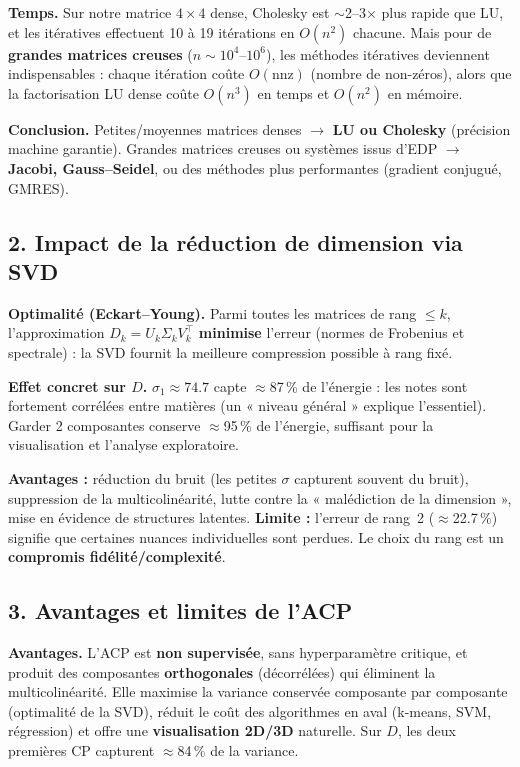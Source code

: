 \documentclass[11pt,a4paper]{article}
\begin{document}
\noindent\textbf{Temps.} Sur notre matrice $4\times4$ dense, Cholesky est $\sim$2--3$\times$ plus
rapide que LU, et les itératives effectuent 10 à 19 itérations en $O(n^2)$ chacune. Mais pour de
\textbf{grandes matrices creuses} ($n\sim10^4$--$10^6$), les méthodes itératives deviennent
indispensables : chaque itération coûte $O(\text{nnz})$ (nombre de non-zéros), alors que la
factorisation LU dense coûte $O(n^3)$ en temps et $O(n^2)$ en mémoire.

\noindent\textbf{Conclusion.} Petites/moyennes matrices denses $\rightarrow$ \textbf{LU ou
Cholesky} (précision machine garantie). Grandes matrices creuses ou systèmes issus d'EDP
$\rightarrow$ \textbf{Jacobi, Gauss--Seidel}, ou des méthodes plus performantes (gradient
conjugué, GMRES).

\subsection*{2. Impact de la réduction de dimension via SVD}
\textbf{Optimalité (Eckart--Young).} Parmi toutes les matrices de rang $\le k$, l'approximation
$D_k=U_k\Sigma_k V_k^{\top}$ \textbf{minimise} l'erreur (normes de Frobenius et spectrale) : la SVD
fournit la meilleure compression possible à rang fixé.

\noindent\textbf{Effet concret sur $D$.} $\sigma_1\approx74.7$ capte $\approx$87\,\% de l'énergie :
les notes sont fortement corrélées entre matières (un « niveau général » explique l'essentiel).
Garder 2 composantes conserve $\approx$95\,\% de l'énergie, suffisant pour la visualisation et
l'analyse exploratoire.

\noindent\textbf{Avantages :} réduction du bruit (les petites $\sigma$ capturent souvent du bruit),
suppression de la multicolinéarité, lutte contre la « malédiction de la dimension », mise en
évidence de structures latentes. \textbf{Limite :} l'erreur de rang~2 ($\approx$22.7\,\%)
signifie que certaines nuances individuelles sont perdues. Le choix du rang est un
\textbf{compromis fidélité/complexité}.

\subsection*{3. Avantages et limites de l'ACP}
\textbf{Avantages.} L'ACP est \textbf{non supervisée}, sans hyperparamètre critique, et produit des
composantes \textbf{orthogonales} (décorrélées) qui éliminent la multicolinéarité. Elle maximise la
variance conservée composante par composante (optimalité de la SVD), réduit le coût des algorithmes
en aval (k-means, SVM, régression) et offre une \textbf{visualisation 2D/3D} naturelle. Sur $D$,
les deux premières CP capturent $\approx$84\,\% de la variance.
\end{document}
